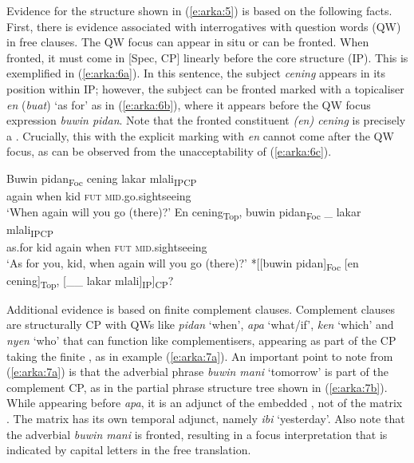 \documentclass[output=paper
,modfonts
,nonflat]{langsci/langscibook}
\begin{document}
Evidence for the structure shown in (\ref{e:arka:5}) is based on the following facts. First, there is evidence associated with interrogatives with question words (QW) in free clauses. The QW focus can appear in situ or can be fronted. When fronted, it must come in [Spec, CP] linearly before the core  structure (IP). This is exemplified in (\ref{e:arka:6a}). In this sentence, the subject \textit{cening} appears in its position within IP; however, the subject can be fronted marked with a topicaliser \textit{en} (\textit{buat}) ‘as for’ as in (\ref{e:arka:6b}), where it appears before the QW focus expression \textit{buwin pidan}. Note that the fronted constituent \textit{(en) cening} is precisely a . Crucially, this  with the explicit marking with \textit{en} cannot come after the QW focus, as can be observed from the unacceptability of (\ref{e:arka:6c}). 

\begin{exe}
	\ex\label{e:arka:6}
	\begin{xlist}
		\ex\label{e:arka:6a}
		\gll {\ob}{\ob}Buwin pidan{\cb}\textsubscript{Foc} {\ob}cening lakar mlali{\cb}\textsubscript{IP}{\cb}\textsubscript{CP}{\USQMark}\\
		\phantom{[[}again  when  {\ob}kid  \textsc{fut}  \textsc{mid}.go.sightseeing\\
		\glt ‘When again will you go (there)?’
		\ex\label{e:arka:6b}
		\gll {\ob}{\ob}{\USOParen}En{\USCParen} cening{\cb}\textsubscript{Top}, {\ob}buwin   pidan{\cb}\textsubscript{Foc}  {\ob}\_ lakar  mlali{\cb}\textsubscript{IP}{\cb}\textsubscript{CP}{\USQMark}\\
		\phantom{[[}as.for  kid  \phantom{[}again  when {} \textsc{fut} \textsc{mid}.sightseeing\\
		\glt ‘As for you, kid, when again will you go (there)?’
		\ex\label{e:arka:6c}
		*[[buwin pidan]\textsubscript{Foc}   [en cening]\textsubscript{Top},  [\_\_ lakar mlali]\textsubscript{IP}]\textsubscript{CP}?
	\end{xlist}
\end{exe}

\noindent
Additional evidence is based on finite complement clauses. Complement clauses are structurally CP with QWs like \textit{pidan} ‘when’, \textit{apa} ‘what/if’, \textit{ken} ‘which’ and \textit{nyen} ‘who’ that can function like complementisers, appearing as part of the CP taking the finite , as in example (\ref{e:arka:7a}). An important point to note from (\ref{e:arka:7a}) is that the adverbial phrase \textit{buwin mani} ‘tomorrow’ is part of the complement  CP, as in the partial phrase structure tree shown in (\ref{e:arka:7b}). While appearing before \textit{apa}, it is an adjunct of the embedded , not of the matrix . The matrix  has its own temporal adjunct, namely \textit{ibi} ‘yesterday’. Also note that the adverbial \textit{buwin mani} is fronted, resulting in a focus interpretation that is indicated by capital letters in the free translation.  
\end{document}
